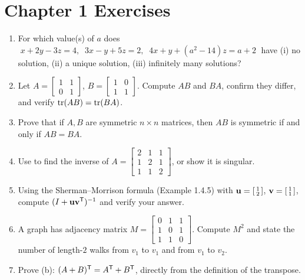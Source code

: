 \section*{Chapter 1 Exercises}

\begin{enumerate}[label=\textbf{1.\arabic*},leftmargin=2.6em,itemsep=6pt]
\item For which value(s) of $a$ does
$\;x+2y-3z=4,\;\;3x-y+5z=2,\;\;4x+y+(a^2-14)z=a+2\;$
have (i) no solution, (ii) a unique solution, (iii) infinitely many solutions?

\item Let $A=\left[\begin{smallmatrix}1&1\\0&1\end{smallmatrix}\right]$, $B=\left[\begin{smallmatrix}1&0\\1&1\end{smallmatrix}\right]$. Compute $AB$ and $BA$, confirm they differ, and verify $\operatorname{tr}(AB)=\operatorname{tr}(BA)$.

\item Prove that if $A,B$ are symmetric $n\times n$ matrices, then $AB$ is symmetric if and only if $AB=BA$.

\item Use  to find the inverse of $A=\left[\begin{smallmatrix}2&1&1\\1&2&1\\1&1&2\end{smallmatrix}\right]$, or show it is singular.

\item Using the Sherman--Morrison formula (Example 1.4.5) with $\mathbf{u}=\left[\begin{smallmatrix}1\\2\end{smallmatrix}\right]$, $\mathbf{v}=\left[\begin{smallmatrix}1\\1\end{smallmatrix}\right]$, compute $(I+\mathbf{u}\mathbf{v}^{\mathsf{T}})^{-1}$ and verify your answer.

\item A graph has adjacency matrix $M=\left[\begin{smallmatrix}0&1&1\\1&0&1\\1&1&0\end{smallmatrix}\right]$. Compute $M^2$ and state the number of length-$2$ walks from $v_1$ to $v_1$ and from $v_1$ to $v_2$.

\item Prove (b): $(A+B)^{\mathsf{T}}=A^{\mathsf{T}}+B^{\mathsf{T}}$, directly from the definition of the transpose.
\end{enumerate}

